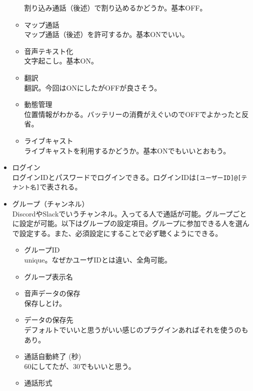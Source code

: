 \documentclass[dvipdfmx,jb5]{jreport}
\newcommand{\terlogy}[2][|]{\colorbox{terlogy}{\texttt{\lstinline#1#2#1}}}
\begin{document}
\begin{itemize}
\begin{itemize}
                        割り込み通話（後述）で割り込めるかどうか。基本OFF。
                  \item マップ通話\\
                        マップ通話（後述）を許可するか。基本ONでいい。
                  \item 音声テキスト化\\
                        文字起こし。基本ON。
                  \item 翻訳\\
                        翻訳。今回はONにしたがOFFが良さそう。
                  \item 動態管理\\
                        位置情報がわかる。バッテリーの消費がえぐいのでOFFでよかったと反省。
                  \item ライブキャスト\\
                        ライブキャストを利用するかどうか。基本ONでもいいとおもう。
            \end{itemize}
      \item ログイン\\
            ログインIDとパスワードでログインできる。ログインIDは\terlogy{[ユーザーID]@[テナント名]}で表される。
      \item グループ（チャンネル）\\
            DiscordやSlackでいうチャンネル。入ってる人で通話が可能。グループごとに設定が可能。以下はグループの設定項目。グループに参加できる人を選んで設定する。また、必須設定にすることで必ず聴くようにできる。
            \begin{itemize}
                  \item グループID\\
                        unique。なぜかユーザIDとは違い、全角可能。
                  \item グループ表示名
                  \item 音声データの保存\\
                        保存しとけ。
                  \item データの保存先\\
                        デフォルトでいいと思うがいい感じのプラグインあればそれを使うのもあり。
                  \item 通話自動終了 (秒)\\
                        60にしてたが、30でもいいと思う。
                  \item 通話形式\\

\end{itemize}
\end{itemize}
\end{document}
